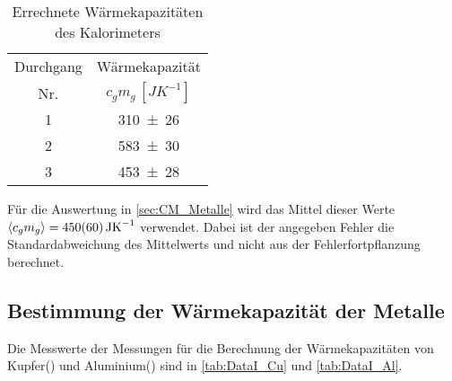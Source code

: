 	\begin{table}[!h]
		\centering
		\begin{tabular}{|c|c|}	
		\hline
			Durchgang & Wärmekapazität\\
			Nr.		  & $c_{g}m_{g}\,[\si{JK^{-1}}]$\\ \hline
			1& \num{310(26)}    \\    
			2& \num{583(30)}	  \\
			3& \num{453(28)}   \\
			\hline
		\end{tabular}
		\caption{Errechnete Wärmekapazitäten des Kalorimeters}
	\end{table}
	
	Für die Auswertung in \autoref{sec:CM_Metalle} wird das Mittel
	dieser Werte $\mean{c_{g}m_{g}} = \SI{450(60)}{JK^{-1}}$ verwendet.
	Dabei ist der angegeben Fehler die Standardabweichung des Mittelwerts
	und nicht aus der Fehlerfortpflanzung berechnet.
	
	 
\subsection{Bestimmung der Wärmekapazität der Metalle}\label{sec:CM_Metalle}
	
	Die Messwerte der Messungen für die Berechnung der Wärmekapazitäten 
	von Kupfer() und Aluminium() sind in \autoref{tab:DataI_Cu}
	und \ref{tab:DataI_Al}.
	
